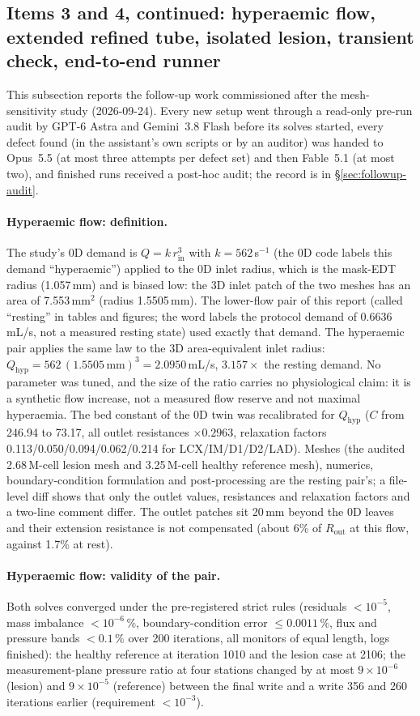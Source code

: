 \documentclass[11pt]{article}
\begin{document}
\subsection{Items 3 and 4, continued: hyperaemic flow, extended refined tube, isolated lesion, transient check, end-to-end runner}
\label{sec:followup}
This subsection reports the follow-up work commissioned after the mesh-sensitivity study (2026-09-24). Every new setup went through a read-only pre-run audit by GPT-6 Astra and Gemini~3.8 Flash before its solves started, every defect found (in the assistant's own scripts or by an auditor) was handed to Opus~5.5 (at most three attempts per defect set) and then Fable~5.1 (at most two), and finished runs received a post-hoc audit; the record is in \S\ref{sec:followup-audit}.

\paragraph{Hyperaemic flow: definition.} The study's 0D demand is $Q=k\,r_\text{in}^3$ with $k=562$\,s$^{-1}$ (the 0D code labels this demand ``hyperaemic'') applied to the 0D inlet radius, which is the mask-EDT radius (1.057\,mm) and is biased low: the 3D inlet patch of the two meshes has an area of 7.553\,mm$^2$ (radius 1.5505\,mm). The lower-flow pair of this report (called ``resting'' in tables and figures; the word labels the protocol demand of $0.6636$\,mL/s, not a measured resting state) used exactly that demand. The hyperaemic pair applies the same law to the 3D area-equivalent inlet radius: $Q_\text{hyp}=562\,(1.5505\,\text{mm})^3=2.0950$\,mL/s, $3.157\times$ the resting demand. No parameter was tuned, and the size of the ratio carries no physiological claim: it is a synthetic flow increase, not a measured flow reserve and not maximal hyperaemia. The bed constant of the 0D twin was recalibrated for $Q_\text{hyp}$ ($C$ from 246.94 to 73.17, all outlet resistances $\times0.2963$, relaxation factors 0.113/0.050/0.094/0.062/0.214 for LCX/IM/D1/D2/LAD). Meshes (the audited 2.68\,M-cell lesion mesh and 3.25\,M-cell healthy reference mesh), numerics, boundary-condition formulation and post-processing are the resting pair's; a file-level diff shows that only the outlet values, resistances and relaxation factors and a two-line comment differ. The outlet patches sit 20\,mm beyond the 0D leaves and their extension resistance is not compensated (about 6\% of $R_\text{out}$ at this flow, against 1.7\% at rest).

\paragraph{Hyperaemic flow: validity of the pair.} Both solves converged under the pre-registered strict rules (residuals $<10^{-5}$, mass imbalance $<10^{-6}\,\%$, boundary-condition error $\le0.0011\,\%$, flux and pressure bands $<0.1\,\%$ over 200 iterations, all monitors of equal length, logs finished): the healthy reference at iteration 1010 and the lesion case at 2106; the measurement-plane pressure ratio at four stations changed by at most $9\times10^{-6}$ (lesion) and $9\times10^{-5}$ (reference) between the final write and a write 356 and 260 iterations earlier (requirement $<10^{-3}$).
\end{document}
